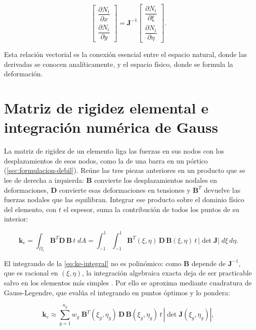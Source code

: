 \begin{equation}
\begin{bmatrix}
\dfrac{\partial N_i}{\partial x} \\[6pt]
\dfrac{\partial N_i}{\partial y}
\end{bmatrix}
= \bm{J}^{-1}
\begin{bmatrix}
\dfrac{\partial N_i}{\partial \xi} \\[6pt]
\dfrac{\partial N_i}{\partial \eta}
\end{bmatrix}.
\label{eq:fisica-natural}
\end{equation}

Esta relación vectorial es la conexión esencial entre el espacio natural, donde las derivadas se conocen analíticamente, y el espacio físico, donde se formula la deformación.

\section{Matriz de rigidez elemental e integración numérica de Gauss}
\label{sec:rigidez-gauss}

La matriz de rigidez de un elemento liga las fuerzas en sus nodos con los desplazamientos de esos nodos, como la de una barra en un pórtico (\autoref{sec:formulacion-debil}). Reúne las tres piezas anteriores en un producto que se lee de derecha a izquierda: $\bm{B}$ convierte los desplazamientos nodales en deformaciones, $\bm{D}$ convierte esas deformaciones en tensiones y $\bm{B}^T$ devuelve las fuerzas nodales que las equilibran. Integrar ese producto sobre el dominio físico del elemento, con $t$ el espesor, suma la contribución de todos los puntos de su interior:

\begin{equation}
\bm{k}_e = \int_{\Omega_e} \bm{B}^T \bm{D}\, \bm{B}\, t \; dA
= \int_{-1}^{1}\!\!\int_{-1}^{1} \bm{B}^T(\xi,\eta)\,\bm{D}\,\bm{B}(\xi,\eta)\, t\, |\det\bm{J}|\; d\xi\, d\eta.
\label{eq:ke-integral}
\end{equation}

El integrando de la \autoref{eq:ke-integral} no es polinómico: como $\bm{B}$ depende de $\bm{J}^{-1}$, que es racional en $(\xi,\eta)$, la integración algebraica exacta deja de ser practicable salvo en los elementos más simples \autocites[p.~147]{zienkiewicz2013fem}[p.~191]{hughes2000fem}. Por ello se aproxima mediante cuadratura de Gauss-Legendre, que evalúa el integrando en puntos óptimos y lo pondera:

\begin{equation}
\bm{k}_e \approx \sum_{g=1}^{n_g} w_g\; \bm{B}^T(\xi_g,\eta_g)\,\bm{D}\,\bm{B}(\xi_g,\eta_g)\, t\, |\det\bm{J}(\xi_g,\eta_g)|,
\label{eq:ke-gauss}
\end{equation}

